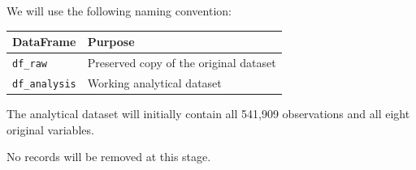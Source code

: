 \documentclass[11pt]{article}
\begin{document}
We will use the following naming convention:

{\def\LTcaptype{none} %
\begin{longtable}[]{@{}ll@{}}
\toprule\noalign{}
DataFrame & Purpose \\
\midrule\noalign{}
\endhead
\bottomrule\noalign{}
\endlastfoot
\texttt{df\_raw} & Preserved copy of the original dataset \\
\texttt{df\_analysis} & Working analytical dataset \\
\end{longtable}
}

The analytical dataset will initially contain all 541,909 observations
and all eight original variables.

No records will be removed at this stage.
\end{document}
